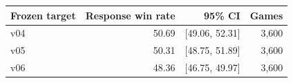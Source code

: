 \begin{tabular}{lrrr}
\toprule
Frozen target & Response win rate & 95\% CI & Games \\
\midrule
v04 & 50.69 & [49.06, 52.31] & 3,600 \\
v05 & 50.31 & [48.75, 51.89] & 3,600 \\
v06 & 48.36 & [46.75, 49.97] & 3,600 \\
\bottomrule
\end{tabular}
